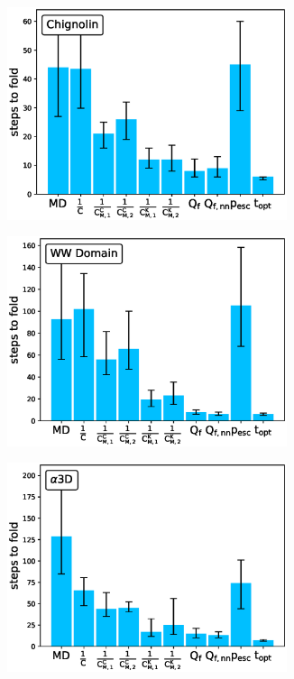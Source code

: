 \begin{figure}[t!]
  \begin{subfigure}[t]{0.5\textwidth}
    \includegraphics[width=0.9\textwidth]{figures/CLN025_7_steps10000_nparallel100_fold.eps}
  \end{subfigure}
  \begin{subfigure}[t]{0.5\textwidth}
    \includegraphics[width=0.9\textwidth]{figures/GTT_7_steps10000_nparallel100_fold.eps}
  \end{subfigure}
  \begin{subfigure}[t]{0.5\textwidth}
    \includegraphics[width=0.9\textwidth]{figures/A3D_7_steps10000_nparallel100_fold.eps}

\end{subfigure}
\end{figure}
